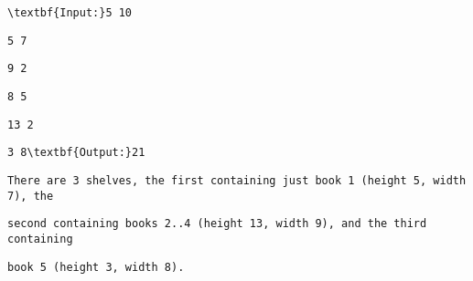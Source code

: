 \begin{verbatim}
\textbf{Input:}5 10 \end{verbatim}
\begin{verbatim}
5 7 \end{verbatim}
\begin{verbatim}
9 2 \end{verbatim}
\begin{verbatim}
8 5 \end{verbatim}
\begin{verbatim}
13 2 \end{verbatim}
\begin{verbatim}
3 8\textbf{Output:}21\end{verbatim}
\begin{verbatim}
There are 3 shelves, the first containing just book 1 (height 5, width 7), the \end{verbatim}
\begin{verbatim}
second containing books 2..4 (height 13, width 9), and the third containing \end{verbatim}
\begin{verbatim}
book 5 (height 3, width 8).\end{verbatim}